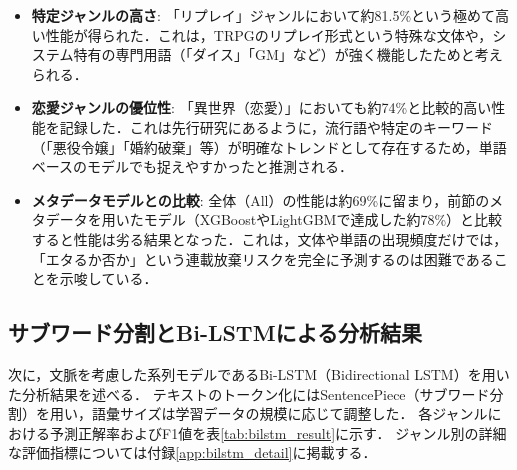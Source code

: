 \documentclass[uplatex, dvipdfmx, 11pt, a4paper, report]{jsbook}
\begin{document}
\begin{itemize}
    \item \textbf{特定ジャンルの高さ}: 「リプレイ」ジャンルにおいて約81.5\%という極めて高い性能が得られた．これは，TRPGのリプレイ形式という特殊な文体や，システム特有の専門用語（「ダイス」「GM」など）が強く機能したためと考えられる．
    \item \textbf{恋愛ジャンルの優位性}: 「異世界（恋愛）」においても約74\%と比較的高い性能を記録した．これは先行研究にあるように，流行語や特定のキーワード（「悪役令嬢」「婚約破棄」等）が明確なトレンドとして存在するため，単語ベースのモデルでも捉えやすかったと推測される．
    \item \textbf{メタデータモデルとの比較}: 全体（All）の性能は約69\%に留まり，前節のメタデータを用いたモデル（XGBoostやLightGBMで達成した約78\%）と比較すると性能は劣る結果となった．これは，文体や単語の出現頻度だけでは，「エタるか否か」という連載放棄リスクを完全に予測するのは困難であることを示唆している．
\end{itemize}

\subsection{サブワード分割とBi-LSTMによる分析結果}
次に，文脈を考慮した系列モデルであるBi-LSTM（Bidirectional LSTM）を用いた分析結果を述べる．
テキストのトークン化にはSentencePiece（サブワード分割）を用い，語彙サイズは学習データの規模に応じて調整した．
各ジャンルにおける予測正解率およびF1値を表\ref{tab:bilstm_result}に示す．
ジャンル別の詳細な評価指標については付録\ref{app:bilstm_detail}に掲載する．
\end{document}
